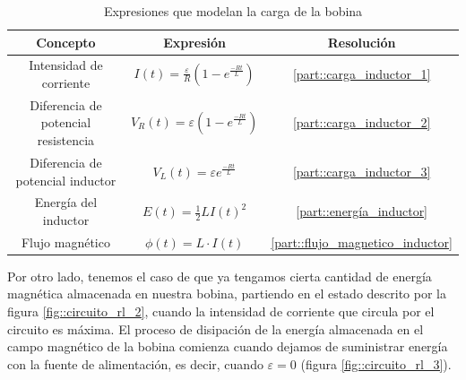 \documentclass[../main.tex]{subfiles}
\begin{document}
\begin{table}[!ht]
        \begin{center}
            \begin{tabular}{|| c | c | c ||}
                \hline
                \textbf{Concepto} & \textbf{Expresión} &  \textbf{Resolución}\\ \hline
                Intensidad de corriente & $I(t) = \frac{\varepsilon}{R} \left( 1 - e^{\frac{-Rt}{L}}\right)$ & \ref{part::carga_inductor_1}\\
                Diferencia de potencial resistencia & $V_R(t) = \varepsilon \left( 1 - e^{\frac{-Rt}{L}}\right)$ & \ref{part::carga_inductor_2} \\ 
                Diferencia de potencial inductor & $V_L(t) = \varepsilon   e^{\frac{-Rt}{L}}$ & \ref{part::carga_inductor_3} \\ 
                Energía del inductor & $E(t) = \frac{1}{2}LI(t)^2 $ & \ref{part::energía_inductor} \\
                Flujo magnético & $\phi (t) = L \cdot I(t)$ & \ref{part::flujo_magnetico_inductor} \\
                \hline
                \end{tabular}
                \caption{Expresiones que modelan la carga de la bobina}
                \label{tab::ecuaciones_carga_rl}
        \end{center}
    \end{table}
    
Por otro lado, tenemos el caso de que ya tengamos cierta cantidad de energía magnética almacenada en nuestra bobina, partiendo en el estado descrito por la figura \ref{fig::circuito_rl_2}, cuando la intensidad de corriente que circula por el circuito es máxima. El proceso de disipación de la energía almacenada en el campo magnético de la bobina comienza cuando dejamos de suministrar energía con la fuente de alimentación, es decir, cuando $\varepsilon = 0$ (figura \ref{fig::circuito_rl_3}). \\
    
\end{document}
